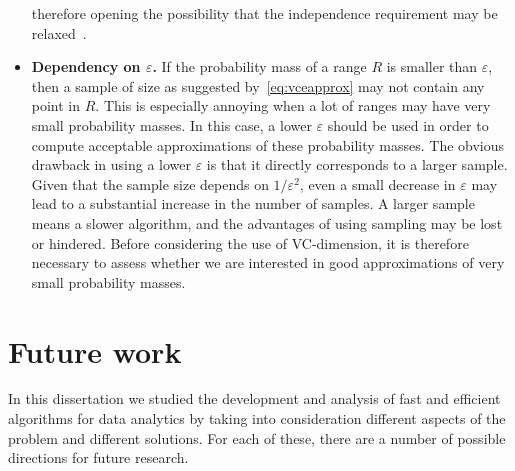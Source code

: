 \begin{itemize}
    therefore opening the possibility that the independence requirement may be
    relaxed~\citep{Catoni04,AdamsN11,AdamsN13,VanHandel13}.
  \item{\bf Dependency on $\varepsilon$.} If the probability mass of a range $R$ is
    smaller than $\varepsilon$, then a sample of size as suggested
    by~\eqref{eq:vceapprox} may not contain any point in $R$. This is especially annoying when a lot
    of ranges may have very small probability masses. In this case, a lower
    $\varepsilon$ should be used in order to compute acceptable approximations
    of these probability masses. The obvious drawback in using a lower
    $\varepsilon$ is that it directly corresponds to a larger sample. Given that
    the sample size depends on $1/\varepsilon^2$, even a small decrease in
    $\varepsilon$ may lead to a substantial increase in the number of samples. A larger
    sample means a slower algorithm, and the advantages of using sampling may be
    lost or hindered. Before considering the use of VC-dimension, it is therefore
    necessary to assess whether we are interested in good approximations of very
    small probability masses. 
\end{itemize}

\section*{Future work} 
In this dissertation we studied the development and analysis of fast and
efficient algorithms for data analytics by taking into consideration different
aspects of the problem and different solutions. For each of these, there are a
number of possible directions for future research.

